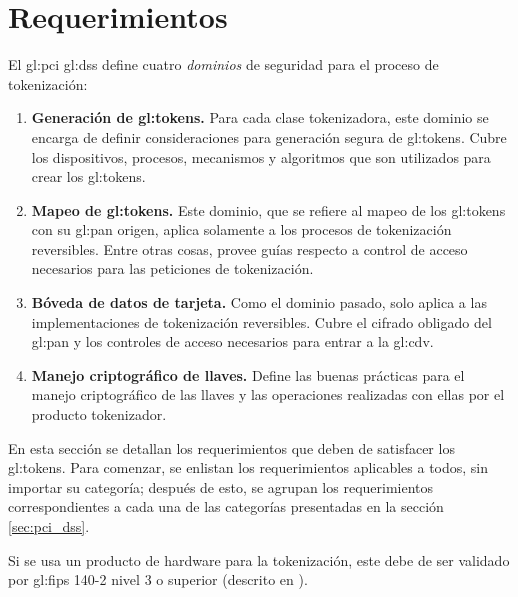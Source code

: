 %
%

\section{Requerimientos}
\label{sec:requerimientos}

El \gls{gl:pci} \gls{gl:dss} define cuatro \textit{dominios} de seguridad para
el proceso de tokenización:

\begin{enumerate}

  \item \label{dm:gen_tokens} \textbf{Generación de \glspl{gl:token}.}
    Para cada clase tokenizadora, este dominio se encarga de definir
    consideraciones para generación segura de \glspl{gl:token}. Cubre los
    dispositivos, procesos, mecanismos y algoritmos que son utilizados para
    crear los \glspl{gl:token}.

  \item \label{dm:mapeo_tokens} \textbf{Mapeo de \glspl{gl:token}.}
    Este dominio, que se refiere al mapeo de los \glspl{gl:token} con su
    \gls{gl:pan} origen, aplica solamente a los procesos de tokenización
    reversibles. Entre otras cosas, provee guías respecto a control de acceso
    necesarios para las peticiones de tokenización.

  \item \label{dm:card_data} \textbf{Bóveda de datos de tarjeta.}
    Como el dominio pasado, solo aplica a las implementaciones de tokenización
    reversibles. Cubre el cifrado obligado del \gls{gl:pan} y los controles de
    acceso necesarios para entrar a la \gls{gl:cdv}.

  \item \label{dm:man_llaves} \textbf{Manejo criptográfico de llaves.}
    Define las buenas prácticas para el manejo criptográfico de las llaves y
    las operaciones realizadas con ellas por el producto tokenizador.

\end{enumerate}

En esta sección se detallan los requerimientos que deben de satisfacer los
\glspl{gl:token}. Para comenzar, se enlistan los requerimientos
aplicables a todos, sin importar su categoría; después de esto, se agrupan los
requerimientos correspondientes a cada una de las categorías presentadas en
la sección \ref{sec:pci_dss}.

{
  Si se usa un producto de hardware para la tokenización, este debe de ser
  validado por \gls{gl:fips} 140-2 nivel 3 o superior (descrito en
  \cite{nist_modulos_criptograficos}).
}

